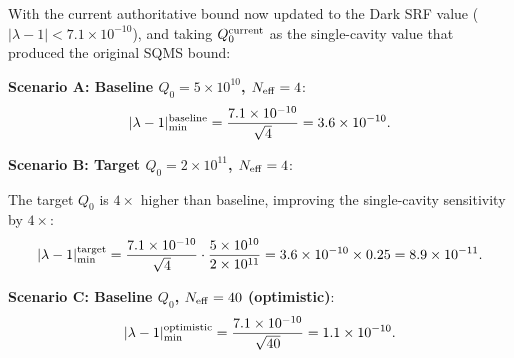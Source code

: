 \documentclass[11pt]{article}
\newcommand{\lbone}{|\lambda - 1|}
\newcommand{\ee}[1]{\times 10^{#1}}
\theoremstyle{definition}
\theoremstyle{remark}
\begin{document}
With the current authoritative bound now updated to the Dark SRF
value ($\lbone < 7.1\ee{-10}$), and taking $Q_0^{\rm current}$
as the single-cavity value that produced the original SQMS bound:

\textbf{Scenario A: Baseline $Q_0 = 5\ee{10}$, $N_{\rm eff} = 4$}:
\begin{equation}
\lbone_{\rm min}^{\rm baseline} = \frac{7.1\ee{-10}}{\sqrt{4}}
= 3.6\ee{-10}.
\label{eq:reach_baseline}
\end{equation}

\textbf{Scenario B: Target $Q_0 = 2\ee{11}$, $N_{\rm eff} = 4$}:

The target $Q_0$ is $4\times$ higher than baseline, improving the
single-cavity sensitivity by $4\times$:
\begin{equation}
\lbone_{\rm min}^{\rm target} = \frac{7.1\ee{-10}}{\sqrt{4}}
\cdot\frac{5\ee{10}}{2\ee{11}}
= 3.6\ee{-10}\times 0.25 = 8.9\ee{-11}.
\label{eq:reach_target}
\end{equation}

\textbf{Scenario C: Baseline $Q_0$, $N_{\rm eff} = 40$ (optimistic)}:
\begin{equation}
\lbone_{\rm min}^{\rm optimistic} = \frac{7.1\ee{-10}}{\sqrt{40}}
= 1.1\ee{-10}.
\label{eq:reach_optimistic}
\end{equation}
\end{document}
